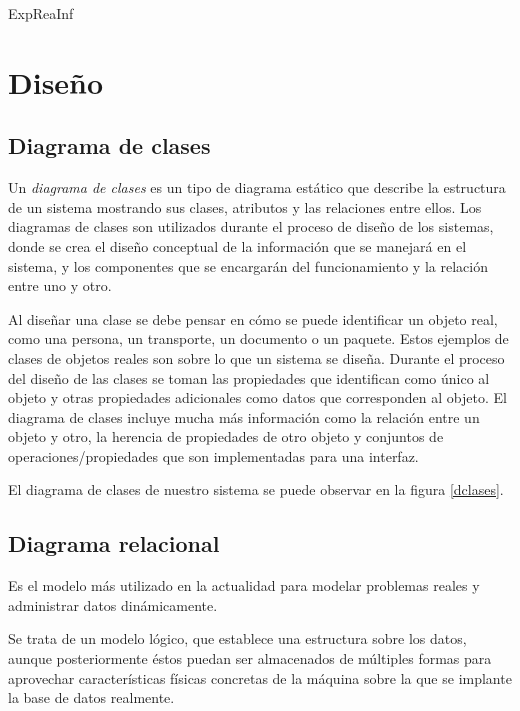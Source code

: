 \documentclass[11pt,a4paper,spanish,twoside]{book}
\begin{document}
{ExpReaInf}

\chapter{Diseño}
\section{Diagrama de clases}
Un \emph{diagrama de clases} es un tipo de diagrama estático que describe la
estructura de un sistema mostrando sus clases, atributos y las relaciones
entre ellos. Los diagramas de clases son utilizados durante el proceso de
diseño de los sistemas, donde se crea el diseño conceptual de la
información que se manejará en el sistema, y los componentes que se
encargarán del funcionamiento y la relación entre uno y otro.

Al diseñar una clase se debe pensar en cómo se puede identificar un objeto
real, como una persona, un transporte, un documento o un paquete. Estos
ejemplos de clases de objetos reales son sobre lo que un sistema se
diseña. Durante el proceso del diseño de las clases se toman las propiedades
que identifican como único al objeto y otras propiedades adicionales como
datos que corresponden al objeto. El diagrama de clases incluye mucha más
información como la relación entre un objeto y otro, la herencia de
propiedades de otro objeto y conjuntos de operaciones/propiedades que son
implementadas para una interfaz.

El diagrama de clases de nuestro sistema se puede observar en la figura
\ref{dclases}.

\begin{sidewaystable}
\end{sidewaystable}

\section{Diagrama relacional}
Es el modelo más utilizado en la actualidad para modelar problemas reales y 
administrar datos dinámicamente.

Se trata de un modelo lógico, que establece una estructura sobre los datos,
aunque posteriormente éstos puedan ser almacenados de múltiples formas para
aprovechar características físicas concretas de la máquina sobre la que se
implante la base de datos realmente.
\end{document}
